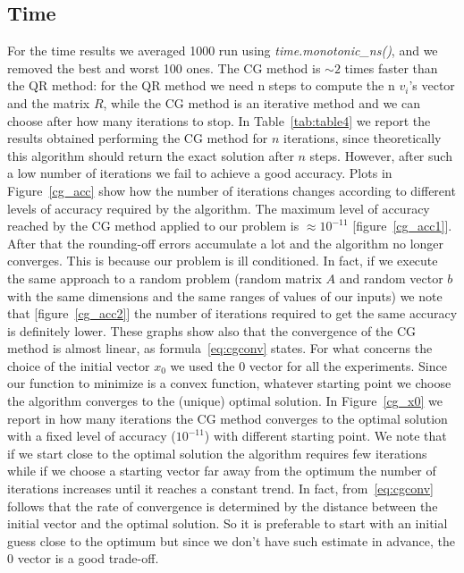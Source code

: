 \documentclass{article}
\begin{document}
\subsection{Time}\label{subsec:time}
For the time results we averaged 1000 run using \textit{time.monotonic\_ns()}, and we removed the best and worst 100 ones.
The CG method is $\sim 2$ times faster than the QR method: for the QR method we need n steps to compute the n $v_{i}$'s vector and the matrix $R$, while the CG method is an iterative method and we can choose after how many iterations to stop.
In Table~\ref{tab:table4} we report the results obtained performing the CG method for $n$ iterations, since theoretically this algorithm should return the exact solution after $n$ steps.
However, after such a low number of iterations we fail to achieve a good accuracy.
Plots in Figure~\ref{cg_acc} show how the number of iterations changes according to different levels of accuracy required by the algorithm.
The maximum level of accuracy reached by the CG method applied to our problem is $\approx 10^{-11}$ [figure~\ref{cg_acc1}].
After that the rounding-off errors accumulate a lot and the algorithm no longer converges.
This is because our problem is ill conditioned.
In fact, if we execute the same approach to a random problem (random matrix $A$ and random vector $b$ with the same dimensions and the same ranges of values of our inputs) we note that [figure~\ref{cg_acc2}] the number of iterations required to get the same accuracy is definitely lower.
These graphs show also that the convergence of the CG method is almost linear, as formula~\eqref{eq:cgconv} states.
For what concerns the choice of the initial vector $x_0$ we used the 0 vector for all the experiments.
Since our function to minimize is a convex function, whatever starting point we choose the algorithm converges to the (unique) optimal solution.
In Figure~\ref{cg_x0} we report in how many iterations the CG method converges to the optimal solution with a fixed level of accuracy ($10^{-11}$) with different starting point.
We note that if we start close to the optimal solution the algorithm requires few iterations while if we choose a starting vector far away from the optimum the number of iterations increases until it reaches a constant trend.
In fact, from~\eqref{eq:cgconv} follows that the rate of convergence is determined by the distance between the initial vector and the optimal solution.
So it is preferable to start with an initial guess close to the optimum but since we don't have such estimate in advance, the 0 vector is a good trade-off.
\end{document}
